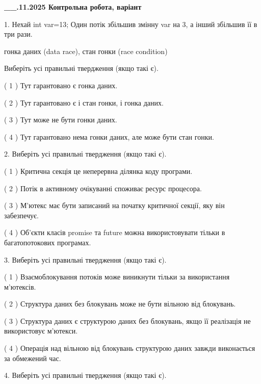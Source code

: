 \documentclass[12pt, ukrainian]{article}
\begin{document}
\newpage
\begin {large}

\textbf{\_\_.11.2025 Контрольна робота, варіант  }\par


{
1. Нехай int var=13; Один потік збільшив змінну var на 3, а інший збільшив її в три рази.

гонка даних (data race), стан гонки (race condition)

Виберіть усі правильні твердження (якщо такі є).\par
\vspace{2mm}
( 1 ) Тут гарантовано є гонка даних.%

( 2 ) Тут гарантовано є і стан гонки, і гонка даних.%

( 3 ) Тут може не бути гонки даних.%

( 4 ) Тут гарантовано нема гонки даних, але може бути стан гонки.%


2. Виберіть усі правильні твердження (якщо такі є).\par
\vspace{2mm}

( 1 ) Критична секція це неперервна ділянка коду програми.%

( 2 ) Потік в активному очікуванні споживає ресурс процесора.%

( 3 ) М’ютекс має бути записаний на початку критичної секції, яку він забезпечує.%

( 4 ) Об’єкти класів promise та future можна використовувати тільки в багатопотокових програмах.%


3. Виберіть усі правильні твердження (якщо такі є).\par
\vspace{2mm}

( 1 ) Взаємоблокування потоків може виникнути тільки за використання м’ютексів.%

( 2 ) Структура даних без блокувань може не бути вільною від блокувань.%

( 3 ) Структура даних є структурою даних без блокувань, якщо її реалізація не використовує м’ютекси.%

( 4 ) Операція над вільною від блокувань структурою даних завжди виконається за обмежений час.%


4. Виберіть усі правильні твердження (якщо такі є).\par
\vspace{2mm}

}
\end{large}
\end{document}
